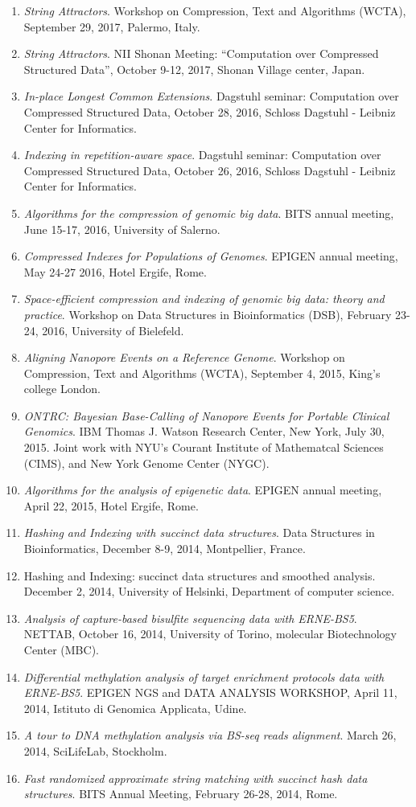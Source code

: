 \documentclass{article}
\begin{document}
\begin{enumerate}
	\setlength\itemsep{-1pt}
	\item \emph{String Attractors}. Workshop on Compression, Text and Algorithms (WCTA), September 29, 2017, Palermo, Italy.
	\item \emph{String Attractors}. NII Shonan Meeting: ``Computation over Compressed Structured Data'', October 9-12, 2017, Shonan Village center, Japan.
	\item \emph{In-place Longest Common Extensions}. Dagstuhl seminar: Computation over Compressed Structured Data, October 28, 2016, Schloss Dagstuhl - Leibniz Center for Informatics.
	\item \emph{Indexing in repetition-aware space}. Dagstuhl seminar: Computation over Compressed Structured Data, October 26, 2016, Schloss Dagstuhl - Leibniz Center for Informatics.
	\item \emph{Algorithms for the compression of genomic big data}. BITS annual meeting, June 15-17, 2016, University of Salerno.
	\item \emph{Compressed Indexes for Populations of Genomes}. EPIGEN annual meeting, May 24-27 2016, Hotel Ergife, Rome.
	\item \emph{Space-efficient compression and indexing of genomic big data: theory and practice}. Workshop on Data Structures in Bioinformatics (DSB), February 23-24, 2016, University of Bielefeld.
	\item \emph{Aligning Nanopore Events on a Reference Genome}. Workshop on Compression, Text and Algorithms (WCTA), September 4, 2015, King's college London.
	\item \emph{ONTRC: Bayesian Base-Calling of Nanopore Events for Portable Clinical Genomics}. IBM Thomas J. Watson Research Center, New York, July 30, 2015. Joint work with NYU's Courant Institute of Mathematcal Sciences (CIMS), and New York Genome Center (NYGC).
	\item \emph{Algorithms for the analysis of epigenetic data}. EPIGEN annual meeting, April 22, 2015, Hotel Ergife, Rome.
	\item \emph{Hashing and Indexing with succinct data structures}. Data Structures in Bioinformatics, December 8-9, 2014, Montpellier, France.
	\item{Hashing and Indexing: succinct data structures and smoothed analysis}. December 2, 2014, University of Helsinki, Department of computer science.
	\item \emph{Analysis of capture-based bisulfite sequencing data with ERNE-BS5}. NETTAB, October 16, 2014, University of Torino, molecular Biotechnology Center (MBC).
	\item \emph{Differential methylation analysis of target enrichment protocols data with ERNE-BS5}. EPIGEN NGS and DATA ANALYSIS WORKSHOP, April 11, 2014, Istituto di Genomica Applicata, Udine.
	\item \emph{A tour to DNA methylation analysis via BS-seq reads alignment}. March 26, 2014, SciLifeLab, Stockholm.
	\item \emph{Fast randomized approximate string matching with succinct hash data structures}. BITS Annual Meeting, February 26-28, 2014, Rome.
\end{enumerate}
\end{document}
